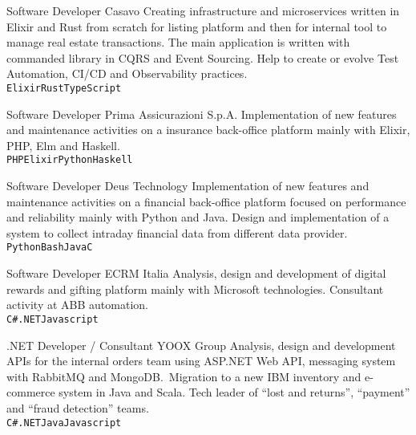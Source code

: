 \documentclass[9pt]{developercv}
\begin{document}
\begin{entrylist}
		{Software Developer}
		{Casavo}
		{Creating infrastructure and microservices written in Elixir and Rust from scratch for listing platform and then for internal tool to manage real estate transactions. The main application is written with commanded library in CQRS and Event Sourcing. Help to create or evolve Test Automation, CI/CD and Observability practices.\\
	   \texttt{Elixir}\slashsep\texttt{Rust}\slashsep\texttt{TypeScript}}

		{Software Developer}
		{Prima Assicurazioni S.p.A.}
		{Implementation of new features and maintenance activities on a insurance back-office platform mainly with Elixir, PHP, Elm and Haskell. \\ \texttt{PHP}\slashsep\texttt{Elixir}\slashsep\texttt{Python}\slashsep\texttt{Haskell}}

		{Software Developer}
		{Deus Technology}
		{Implementation of new features and maintenance activities on a financial back-office platform focused on performance and reliability mainly with Python and Java. Design and implementation of a system to collect intraday financial data from different data provider. \\ \texttt{Python}\slashsep\texttt{Bash}\slashsep\texttt{Java}\slashsep\texttt{C}}

		{Software Developer}
		{ECRM Italia}
		{Analysis, design and development of digital rewards and gifting platform mainly with Microsoft technologies. Consultant activity at ABB automation. \\
	   \texttt{C\#}\slashsep\texttt{.NET}\slashsep\texttt{Javascript}}

		{.NET Developer / Consultant}
		{YOOX Group}
		{Analysis, design and development APIs for the internal orders team using ASP.NET Web API, messaging system with RabbitMQ and MongoDB.\ Migration to a new IBM inventory and e-commerce system in Java and Scala. Tech leader of “lost and returns”, “payment” and “fraud detection” teams. \\
	   \texttt{C\#}\slashsep\texttt{.NET}\slashsep\texttt{Java}\slashsep\texttt{Javascript}}


\end{entrylist}
\end{document}
